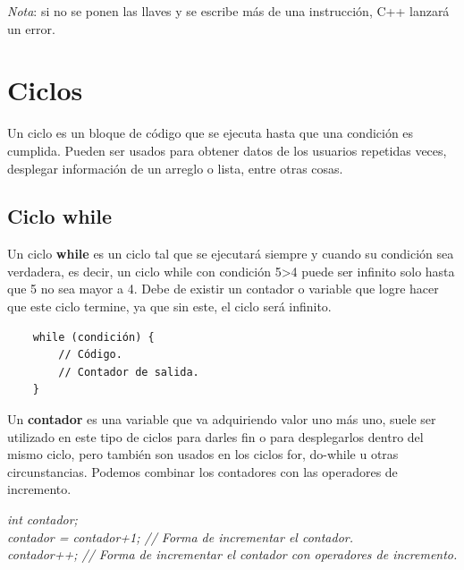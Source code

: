 \textit{Nota}: si no se ponen las llaves y se escribe más de una instrucción, C++ lanzará un error.



\section{Ciclos}
\hspace{0.55cm}Un ciclo es un bloque de código que se ejecuta hasta que una condición es cumplida. Pueden ser usados para obtener datos de los usuarios repetidas veces, desplegar información de un arreglo o lista, entre otras cosas.


\subsection{Ciclo while}
\hspace{0.55cm}Un ciclo \textbf{while} es un ciclo tal que se ejecutará siempre y cuando su condición sea verdadera, es decir, un ciclo while con condición 5\textgreater 4 puede ser infinito solo hasta que 5 no sea mayor a 4. Debe de existir un contador o variable que logre hacer que este ciclo termine, ya que sin este, el ciclo será infinito.
\begin{lstlisting}
    while (condición) {
        // Código.
        // Contador de salida.
    }
\end{lstlisting}

Un \textbf{contador} es una variable que va adquiriendo valor uno más uno, suele ser utilizado en este tipo de ciclos para darles fin o para desplegarlos dentro del mismo ciclo, pero también son usados en los ciclos for, do-while u otras circunstancias. Podemos combinar los contadores con las operadores de incremento.
\begin{center}
	\textit{
		int contador; \\
		contador = contador+1; // Forma de incrementar el contador. \\
		contador++; // Forma de incrementar el contador con operadores de incremento.
	}
\end{center}

